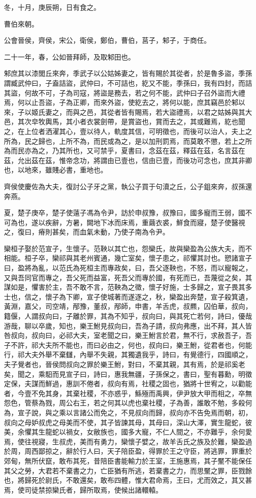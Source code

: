 \begin{pinyinscope}
冬，十月，庚辰朔，日有食之。

曹伯來朝。

公會晉侯，齊侯，宋公，衛侯，鄭伯，曹伯，莒子，邾子，于商任。

二十一年，春，公如晉拜師，及取邾田也。

邾庶其以漆閭丘來奔，季武子以公姑姊妻之，皆有賜於其從者，於是魯多盜，季孫謂臧武仲曰，子盍詰盜，武仲曰，不可詰也，紇又不能，季孫曰，我有四封，而詰其盜，何故不可，子為司寇，將盜是務去，若之何不能，武仲曰子召外盜而大禮焉，何以止吾盜，子為正卿，而來外盜，使紇去之，將何以能，庶其竊邑於邾以來，子以姬氏妻之，而與之邑，其從者皆有賜焉，若大盜禮焉，以君之姑姊與其大邑，其次皁牧輿馬，其小者衣裳劍帶，是賞盜也，賞而去之，其或難焉，紇也聞之，在上位者洒濯其心，壹以待人，軌度其信，可明徵也，而後可以治人，夫上之所為，民之歸也，上所不為，而民或為之，是以加刑罰焉，而莫敢不懲，若上之所為而民亦為之，乃其所也，又可禁乎，夏書曰，念茲在茲，釋茲在茲，名言茲在茲，允出茲在茲，惟帝念功，將謂由已壹也，信由已壹，而後功可念也，庶其非卿也，以地來，雖賤必書，重地也。

齊侯使慶佐為大夫，復討公子牙之黨，執公子買于句瀆之丘，公子鉏來奔，叔孫還奔燕。

夏，楚子庚卒，楚子使薳子馮為令尹，訪於申叔豫，叔豫曰，國多寵而王弱，國不可為也，遂以疾辭，方暑，闕地下冰而床焉，重繭衣裘，鮮食而寢，楚子使醫視之，復曰，瘠則甚矣，而血氣未動，乃使子南為令尹。

欒桓子娶於范宣子，生懷子。范鞅以其亡也，怨欒氏，故與欒盈為公族大夫，而不相能。桓子卒，欒祁與其老州賓通，幾亡室矣，懷子患之，祁懼其討也。愬諸宣子曰，盈將為亂，以范氏為死桓主而專政矣，曰，吾父逐鞅也，不怒，而以寵報之，又與吾同官而專之，吾父死而益富，死吾父而專於國，有死而已，吾蔑從之矣，其謀如是，懼害於主，吾不敢不言，范鞅為之徵，懷子好施，士多歸之，宣子畏其多士也，信之，懷子為下卿，宣子使城著而遂逐之，秋，欒盈出奔楚，宣子殺箕遺，黃淵，嘉父，司空靖，邴豫，董叔，邴師，申書，羊舌虎，叔羆，囚伯華，叔向，籍偃，人謂叔向曰，子離於罪，其為不知乎，叔向曰，與其死亡若何，詩曰，優哉游哉，聊以卒歲，知也，樂王鮒見叔向曰，吾為子請，叔向弗應，出不拜，其人皆咎叔向，叔向曰，必祁大夫，室老聞之曰，樂王鮒言於君，無不行，求赦吾子，吾子不許，祁大夫所不能也，而曰必由之，何也，叔向曰，樂王鮒，從君者也，何能行，祁大夫外舉不棄讎，內舉不失親，其獨遺我乎，詩曰，有覺德行，四國順之，夫子覺者也，晉侯問叔向之罪於樂王鮒，對曰，不棄其親，其有焉，於是祁奚老矣，聞之，乘馹而見宣子曰，詩曰，惠我無疆，子孫保之，書曰，聖有暮勳，明徵定保，夫謀而鮮過，惠訓不倦者，叔向有焉，社稷之固也，猶將十世宥之，以勸能者，今壹不免其身，其棄社稷，不亦惑乎，鯀殛而禹興，伊尹放大甲而相之，卒無怨色，管蔡為戮，周公右王，若之何其以虎也棄社稷，子為善，誰敢不勉，多殺何為，宣子說，與之乘以言諸公而免之，不見叔向而歸，叔向亦不告免焉而朝，初，叔向之母妒叔虎之母美而不使，其子皆諫其母，其母曰，深山大澤，實生龍蛇，彼美，余懼其生龍蛇以禍女，女敝族也，國多大寵，不仁人間之，不亦難乎，余何愛焉，使往視寢，生叔虎，美而有勇力，欒懷子嬖之，故羊舌氏之族及於難，欒盈過於周，周西鄙掠之，辭於行人曰，天子陪臣盈，得罪於王之守臣，將逃罪，罪重於郊甸，無所伏竄，敢布其死，昔陪臣書能輸力於王室，王施惠焉，其子黶不能保任其父之勞，大君若不棄書之力，亡臣猶有所逃，若棄書之力，而思黶之罪，臣戮餘也，將歸死於尉氏，不敢還矣，敢布四體，惟大君命焉，王曰，尤而效之，其又甚焉，使司徒禁掠欒氏者，歸所取焉，使候出諸轘轅。


\end{pinyinscope}
